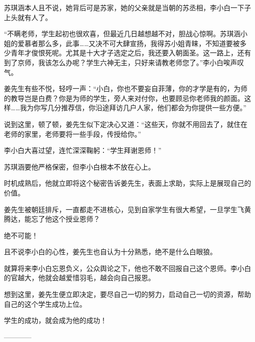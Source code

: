 \begin{this_body}
苏琪涵本人且不说，她背后可是苏家，她的父亲就是当朝的苏丞相，李小白一下子上头就有人了。

“不瞒老师，学生起初也很欢喜，但最近几日越想越不对，胆战心惊啊。苏琪涵小姐的爱慕者那么多，此事……又决不可大肆宣扬，我得苏小姐青睐，不知道要被多少青年才俊恨死呢。尤其是十大才子选定之后，我还要入朝面圣。这一路上，还有到了京师，我该怎么办呢？学生六神无主，只好来请教老师您了。”李小白唉声叹气。

姜先生有些不悦，轻哼一声：“小白，你也不要妄自菲薄，你的才学是有的，为师的教导岂是白费？你是为师的学生，旁人来对付你，也要顾忌你老师我的颜面。这样……我为你写几分推荐信，你沿途拜访几户人家，他们都会为你提供一些方便。”

说到这里，顿了顿，姜先生似下定决心又道：“这些天，你就不用回去了，就住在老师的家里，老师要将一些手段，传授给你。”

李小白大喜过望，连忙深深鞠躬：“学生拜谢恩师！”

苏琪涵要他严格保密，但李小白根本不放在心上。

时机成熟后，他就立即将这个秘密告诉姜先生，表面上求助，实际上是展现自己的价值。

姜先生被朝廷排斥，一直都走不进核心，见到自家学生有很大希望，一旦学生飞黄腾达，能忘了他这个授业恩师？

绝不可能！

且不说李小白的心性，姜先生也自认为十分熟悉，绝不是什么白眼狼。

就算将来李小白忘恩负义，公众舆论之下，他也不敢不回报自己这个恩师。李小白的官越大，他就会越爱惜羽毛，越会向自己报恩。

想到这里，姜先生便立即决定，要尽自己一切的努力，启动自己一切的资源，帮助自己的这个学生成功上位。

学生的成功，就会成为他的成功！

------------

\end{this_body}

